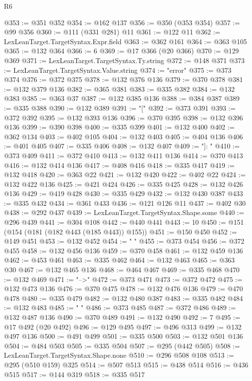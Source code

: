 \begin{lexlean}{R6}
\begin{coremodule}
{{{{{{{{{{{{{{{{{{{{{{{{{{{{{{{{{{{{{{{{{{{{{{{{{{@353 := @351 @352
@354 := @162 @137
@356 := @350 (@353 @354)
@357 := @99 @356
@360 := @111 (@331 @281) @11
@361 := @122 @11
@362 := LexLeanTarget.TargetSyntax.Expr.field
@363 := @362 @161
@364 := @363 @105
@365 := @132 @364
@366 := 6
@369 := @17 @366 (@20 @366)
@370 := @129 @369
@371 := LexLeanTarget.TargetSyntax.Ty.string
@372 := @148 @371
@373 := LexLeanTarget.TargetSyntax.Value.string
@374 := "error"
@375 := @373 @374
@376 := @372 @375
@378 := @132 @376 @136
@379 := @370 @378
@381 := @132 @379 @136
@382 := @365 @381
@383 := @335 @382
@384 := @132 @383
@385 := @363 @37
@387 := @132 @385 @136
@388 := @384 @387
@389 := @335 @388
@390 := @132 @389
@391 := "["
@392 := @373 @391
@393 := @372 @392
@395 := @132 @393 @136
@396 := @370 @395
@398 := @132 @396 @136
@399 := @390 @398
@400 := @335 @399
@401 := @132 @400
@402 := @362 @134
@403 := @402 @105
@404 := @132 @403
@405 := @404 @136
@406 := @401 @405
@407 := @335 @406
@408 := @132 @407
@409 := "]: "
@410 := @373 @409
@411 := @372 @410
@413 := @132 @411 @136
@414 := @370 @413
@416 := @132 @414 @136
@417 := @408 @416
@418 := @335 @417
@419 := @132 @418
@420 := @363 @22
@421 := @132 @420
@422 := @402 @22
@424 := @132 @422 @136
@425 := @421 @424
@426 := @335 @425
@428 := @132 @426 @136
@429 := @419 @428
@430 := @335 @429
@432 := @132 @430 @387
@433 := @335 @432
@434 := @361 @433
@436 := @121 @126 @11
@437 := @402 @30
@438 := @292 @437
@439 := LexLeanTarget.TargetSyntax.Shape.some
@440 := @296 @439
@441 := @304 @108
@442 := @440 @441
@443 := 10
@450 := @151 (@154 (@181 (@182 @443 (@185 @443)) @155))
@451 := @150 @450
@452 := @149 @451
@453 := @132 @452
@454 := "  "
@455 := @373 @454
@456 := @372 @455
@458 := @132 @456 @136
@459 := @370 @458
@461 := @132 @459 @136
@462 := @453 @461
@463 := @335 @462
@464 := @132 @463
@465 := @363 @30
@467 := @132 @465 @136
@468 := @464 @467
@469 := @335 @468
@470 := @132 @469
@471 := "-->"
@472 := @373 @471
@473 := @372 @472
@475 := @132 @473 @136
@476 := @370 @475
@478 := @132 @476 @136
@479 := @470 @478
@480 := @335 @479
@482 := @132 @480 @387
@483 := @335 @482
@484 := @132 @483
@485 := " "
@486 := @373 @485
@487 := @372 @486
@489 := @132 @487 @136
@490 := @370 @489
@491 := @132 @490
@492 := 7
@495 := @17 @492 (@20 @492)
@496 := @129 @495
@497 := @496 @313
@499 := @132 @497 @136
@500 := @491 @499
@501 := @335 @500
@503 := @132 @501 @136
@504 := @484 @503
@505 := @335 @504
@507 := @295 (@442 @505)
@508 := LexLeanTarget.TargetSyntax.Shape.none
@510 := @296 @508 @108
@513 := @295 (@510 @159) @325
@514 := @507 @513
@515 := @438 @514
@516 := @436 @515
@517 := @144 @319
@518 := @335 @517
}}}}}}}}}}}}}}}}}}}}}}}}}}}}}}}}}}}}}}}}}}}}}}}}}}
\end{coremodule}
\end{lexlean}
